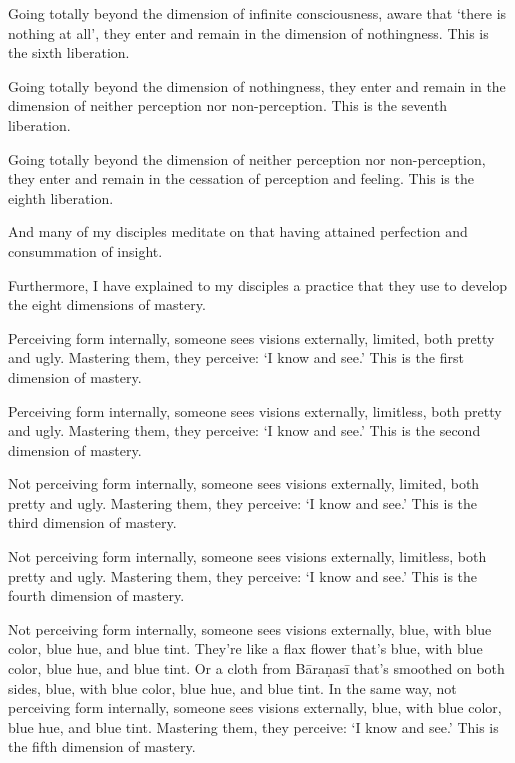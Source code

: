 \documentclass[12pt,openany]{book}%
\begin{document}
Going totally beyond the dimension of infinite consciousness, aware that ‘there is nothing at all’, they enter and remain in the dimension of nothingness. This is the sixth liberation. 

Going totally beyond the dimension of nothingness, they enter and remain in the dimension of neither perception nor non-perception. This is the seventh liberation. 

Going totally beyond the dimension of neither perception nor non-perception, they enter and remain in the cessation of perception and feeling. This is the eighth liberation. 

And many of my disciples meditate on that having attained perfection and consummation of insight. 

Furthermore, I have explained to my disciples a practice that they use to develop the eight dimensions of mastery. 

Perceiving form internally, someone sees visions externally, limited, both pretty and ugly. Mastering them, they perceive: ‘I know and see.’ This is the first dimension of mastery. 

Perceiving form internally, someone sees visions externally, limitless, both pretty and ugly. Mastering them, they perceive: ‘I know and see.’ This is the second dimension of mastery. 

Not perceiving form internally, someone sees visions externally, limited, both pretty and ugly. Mastering them, they perceive: ‘I know and see.’ This is the third dimension of mastery. 

Not perceiving form internally, someone sees visions externally, limitless, both pretty and ugly. Mastering them, they perceive: ‘I know and see.’ This is the fourth dimension of mastery. 

Not perceiving form internally, someone sees visions externally, blue, with blue color, blue hue, and blue tint. They’re like a flax flower that’s blue, with blue color, blue hue, and blue tint. Or a cloth from \textsanskrit{Bāraṇasī} that’s smoothed on both sides, blue, with blue color, blue hue, and blue tint. In the same way, not perceiving form internally, someone sees visions externally, blue, with blue color, blue hue, and blue tint. Mastering them, they perceive: ‘I know and see.’ This is the fifth dimension of mastery. 
\end{document}
